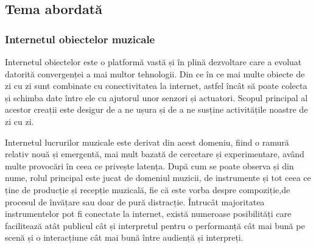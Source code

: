 \documentclass[../IoMusT.tex]{subfiles}
\begin{document}
\subsection{Tema abordată}
\subsubsection{Internetul obiectelor muzicale}
Internetul obiectelor este o platformă vastă și în plină dezvoltare care a evoluat datorită convergenței a mai multor tehnologii. Din ce în ce mai multe obiecte de zi cu zi sunt combinate cu conectivitatea la internet, astfel încât să poate colecta și schimba date între ele cu ajutorul unor senzori și actuatori. Scopul principal al acestor creații este desigur de a ne ușura și de a ne susține activitățile noastre de zi cu zi.
\\
\par Internetul lucrurilor muzicale este derivat din acest domeniu, fiind o ramură relativ nouă și emergentă, mai mult bazată de cercetare și experimentare, având multe provocări în ceea ce privește latența. După cum se poate observa și din nume, rolul principal este jucat de domeniul muzicii, de instrumente și tot ceea ce ține de producție și recepție muzicală, fie că este vorba despre compoziție,de procesul de învățare sau doar de pură dis\-trac\-ți\-e. Întrucât majoritatea instrumentelor pot fi conectate la internet, există numeroase posibilități care facilitează atât publicul cât și interpretul pentru o performanță cât mai bună pe scenă și o interacțiune cât mai bună între audiență și interpreți.\cite{IoMusT}
\\
\end{document}

